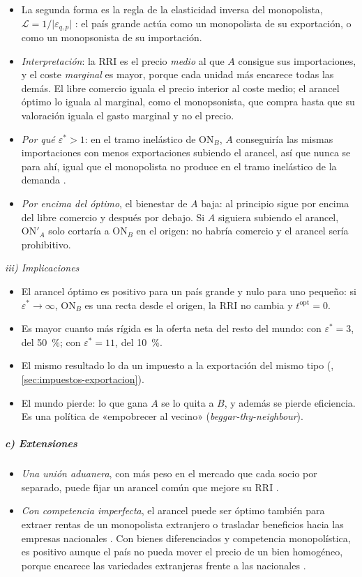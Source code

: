 \documentclass[11pt]{article}
\begin{document}
\begin{itemize}
\item La segunda forma es la regla de la elasticidad inversa del monopolista, $\mathcal{L}=1/\lvert\varepsilon_{q,p}\rvert$ : el país grande actúa como un monopolista de su exportación, o como un monopsonista de su importación.
\item \emph{Interpretación}: la RRI es el precio \emph{medio} al que $A$ consigue sus importaciones, y el coste \emph{marginal} es mayor, porque cada unidad más encarece todas las demás. El libre comercio iguala el precio interior al coste medio; el arancel óptimo lo iguala al marginal, como el monopsonista, que compra hasta que su valoración iguala el gasto marginal y no el precio.
\item \emph{Por qué $\varepsilon^*>1$}: en el tramo inelástico de ON$_B$, $A$ conseguiría las mismas importaciones con menos exportaciones subiendo el arancel, así que nunca se para ahí, igual que el monopolista no produce en el tramo inelástico de la demanda .
\item \emph{Por encima del óptimo}, el bienestar de $A$ baja: al principio sigue por encima del libre comercio y después por debajo. Si $A$ siguiera subiendo el arancel, ON$'_A$ solo cortaría a ON$_B$ en el origen: no habría comercio y el arancel sería prohibitivo.
\end{itemize}

\hspace*{3.6em}\emph{iii) Implicaciones}

\begin{itemize}
\item El arancel óptimo es positivo para un país grande y nulo para uno pequeño: si $\varepsilon^*\to\infty$, ON$_B$ es una recta desde el origen, la RRI no cambia y $t^{\mathrm{opt}}=0$.
\item Es mayor cuanto más rígida es la oferta neta del resto del mundo: con $\varepsilon^*=3$, del 50~\%; con $\varepsilon^*=11$, del 10~\%.
\item El mismo resultado lo da un impuesto a la exportación del mismo tipo (, \ref{sec:impuestos-exportacion}).
\item El mundo pierde: lo que gana $A$ se lo quita a $B$, y además se pierde eficiencia. Es una política de «empobrecer al vecino» (\emph{beggar-thy-neighbour}).
\end{itemize}

\subparagraph{c) Extensiones}

\begin{itemize}
\item \emph{Una unión aduanera}, con más peso en el mercado que cada socio por separado, puede fijar un arancel común que mejore su RRI .
\item \emph{Con competencia imperfecta}, el arancel puede ser óptimo también para extraer rentas de un monopolista extranjero o trasladar beneficios hacia las empresas nacionales . Con bienes diferenciados y competencia monopolística, es positivo aunque el país no pueda mover el precio de un bien homogéneo, porque encarece las variedades extranjeras frente a las nacionales\nocite{Gros1987Note} .
\end{itemize}
\end{document}
